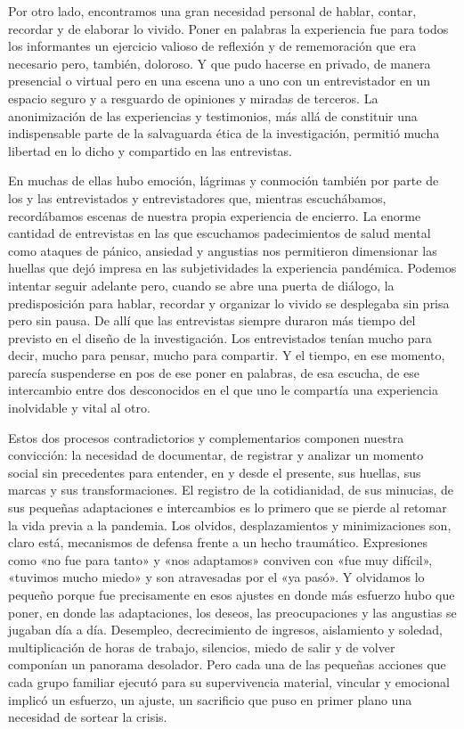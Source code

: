 Por otro lado, encontramos una gran necesidad personal de hablar, contar, recordar y de elaborar lo vivido. Poner en palabras la experiencia fue para todos los informantes un ejercicio valioso de reflexión y de rememoración que era necesario pero, también, doloroso. Y que pudo hacerse en privado, de manera presencial o virtual pero en una escena uno a uno con un entrevistador en un espacio seguro y a resguardo de opiniones y miradas de terceros. La anonimización de las experiencias y testimonios, más allá de constituir una indispensable parte de la salvaguarda ética de la investigación, permitió mucha libertad en lo dicho y compartido en las entrevistas.

En muchas de ellas hubo emoción, lágrimas y conmoción también por parte de los y las entrevistados y entrevistadores que, mientras escuchábamos, recordábamos escenas de nuestra propia experiencia de encierro. La enorme cantidad de entrevistas en las que escuchamos padecimientos de salud mental como ataques de pánico, ansiedad y angustias nos permitieron dimensionar las huellas que dejó impresa en las subjetividades la experiencia pandémica. Podemos intentar seguir adelante pero, cuando se abre una puerta de diálogo, la predisposición para hablar, recordar y organizar lo vivido se desplegaba sin prisa pero sin pausa. De allí que las entrevistas siempre duraron más tiempo del previsto en el diseño de la investigación. Los entrevistados tenían mucho para decir, mucho para pensar, mucho para compartir. Y el tiempo, en ese momento, parecía suspenderse en pos de ese poner en palabras, de esa escucha, de ese intercambio entre dos desconocidos en el que uno le compartía una experiencia inolvidable y vital al otro.

Estos dos procesos contradictorios y complementarios componen nuestra convicción: la necesidad de documentar, de registrar y analizar un momento social sin precedentes para entender, en y desde el presente, sus huellas, sus marcas y sus transformaciones. El registro de la cotidianidad, de sus minucias, de sus pequeñas adaptaciones e intercambios es lo primero que se pierde al retomar la vida previa a la pandemia. Los olvidos, desplazamientos y minimizaciones son, claro está, mecanismos de defensa frente a un hecho traumático. Expresiones como «no fue para tanto» y «nos adaptamos» conviven con «fue muy difícil», «tuvimos mucho miedo» y son atravesadas por el «ya pasó». Y olvidamos lo pequeño porque fue precisamente en esos ajustes en donde más esfuerzo hubo que poner, en donde las adaptaciones, los deseos, las preocupaciones y las angustias se jugaban día a día. Desempleo, decrecimiento de ingresos, aislamiento y soledad, multiplicación de horas de trabajo, silencios, miedo de salir y de volver componían un panorama desolador. Pero cada una de las pequeñas acciones que cada grupo familiar ejecutó para su supervivencia material, vincular y emocional implicó un esfuerzo, un ajuste, un sacrificio que puso en primer plano una necesidad de sortear la crisis.

